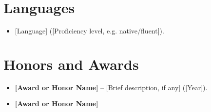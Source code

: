 \documentclass[11pt,a4paper,sans]{moderncv}
\begin{document}

\section{Languages}
\vspace{1pt}
\begin{itemize}
\item {[Language] ([Proficiency level, e.g. native/fluent]).}
\end{itemize}



\section{Honors and Awards}
\vspace{1pt}
\begin{itemize}
\item{\textbf{[Award or Honor Name]} -- [Brief description, if any] ([Year]).}
\item{\textbf{[Award or Honor Name]}}
\end{itemize}
\end{document}
